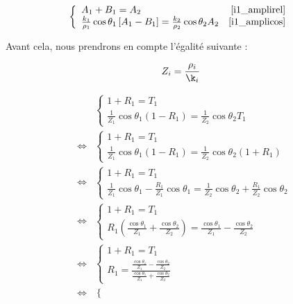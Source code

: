 \begin{eqnarray}
    \left\{\begin{array}{l r}
        A_1 + B_1  = A_2 & \eqref{i1_amplirel}\\
        \frac{k_1}{\rho_1}\cos\theta_1\left[A_1-B_1\right] = \frac{k_2}{\rho_2}\cos\theta_2A_2 & \eqref{i1_amplicos}
    \end{array}\right. \label{i1_rt}
\end{eqnarray}

Avant cela, nous prendrons en compte l'égalité suivante :

$$Z_i = \frac{\rho_i}{\k_i}$$

\begin{eqnarray*}
    & & \left\{\begin{array}{l}
        1 + R_1  = T_1\\ 
        \frac{1}{Z_1}\cos\theta_1(1 - R_1) = \frac{1}{Z_2}\cos\theta_2T_1
    \end{array}\right.\\
    & \Leftrightarrow &
    \left\{\begin{array}{l}
        1 + R_1  = T_1\\ 
        \frac{1}{Z_1}\cos\theta_1(1 - R_1) = \frac{1}{Z_2}\cos\theta_2(1+R_1)
    \end{array}\right.\\
    & \Leftrightarrow &
    \left\{\begin{array}{l}
        1 + R_1  = T_1\\ 
        \frac{1}{Z_1}\cos\theta_1 - \frac{R_1}{Z_1}\cos\theta_1 = \frac{1}{Z_2}\cos\theta_2+\frac{R_1}{Z_2}\cos\theta_2
    \end{array}\right.\\
    & \Leftrightarrow &
    \left\{\begin{array}{l}
        1 + R_1  = T_1\\ 
        R_1\left(\frac{\cos\theta_1}{Z_1} + \frac{\cos\theta_2}{Z_2}\right) = \frac{\cos\theta_1}{Z_1}-\frac{\cos\theta_2}{Z_2}
    \end{array}\right.\\
    & \Leftrightarrow &
    \left\{\begin{array}{l}
        1 + R_1  = T_1\\ 
        R_1 = \frac{\frac{\cos\theta_1}{Z_1}-\frac{\cos\theta_2}{Z_2}}{\frac{\cos\theta_1}{Z_1} + \frac{\cos\theta_2}{Z_2}}
    \end{array}\right.\\
    & \Leftrightarrow &
    \left\{\begin{array}{l}

\end{array}
\end{eqnarray*}
